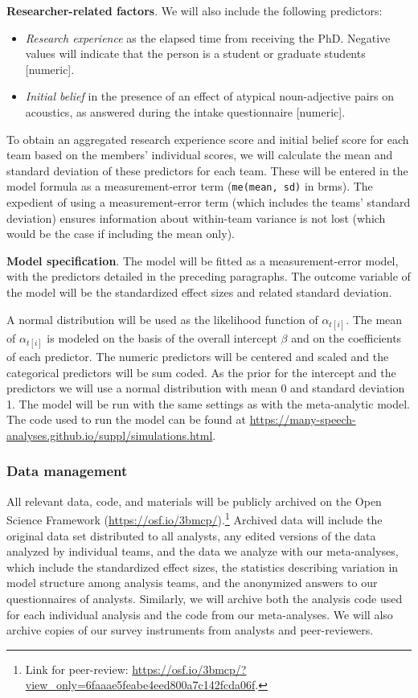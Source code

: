 \documentclass[Review,times,sageh]{sagej}
\providecommand{\tightlist}{\setlength{\itemsep}{0pt}\setlength{\parskip}{0pt}}
\begin{document}
\textbf{Researcher-related factors}. We will also include the following
predictors:

\begin{itemize}
\tightlist
\item
  \emph{Research experience} as the elapsed time from receiving the PhD.
  Negative values will indicate that the person is a student or graduate
  students {[}numeric{]}.
\item
  \emph{Initial belief} in the presence of an effect of atypical
  noun-adjective pairs on acoustics, as answered during the intake
  questionnaire {[}numeric{]}.
\end{itemize}

To obtain an aggregated research experience score and initial belief
score for each team based on the members' individual scores, we will
calculate the mean and standard deviation of these predictors for each
team. These will be entered in the model formula as a measurement-error
term (\texttt{me(mean,\ sd)} in brms). The expedient of using a
measurement-error term (which includes the teams' standard deviation)
ensures information about within-team variance is not lost (which would
be the case if including the mean only).

\textbf{Model specification}. The model will be fitted as a
measurement-error model, with the predictors detailed in the preceding
paragraphs. The outcome variable of the model will be the standardized
effect sizes and related standard deviation.

A normal distribution will be used as the likelihood function of
\(\alpha_{t[i]}\). The mean of \(\alpha_{t[i]}\) is modeled on the basis
of the overall intercept \(\beta\) and on the coefficients of each
predictor. The numeric predictors will be centered and scaled and the
categorical predictors will be sum coded. As the prior for the intercept
and the predictors we will use a normal distribution with mean 0 and
standard deviation 1. The model will be run with the same settings as
with the meta-analytic model. The code used to run the model can be
found at
\url{https://many-speech-analyses.github.io/suppl/simulations.html}.

\subsubsection{Data management}\label{ana-archive}

All relevant data, code, and materials will be publicly archived on the
Open Science Framework (\url{https://osf.io/3bmcp/}).\footnote{Link for
  peer-review:
  \url{https://osf.io/3bmcp/?view_only=6faaae5feabe4eed800a7c142fcda06f}.}
Archived data will include the original data set distributed to all
analysts, any edited versions of the data analyzed by individual teams,
and the data we analyze with our meta-analyses, which include the
standardized effect sizes, the statistics describing variation in model
structure among analysis teams, and the anonymized answers to our
questionnaires of analysts. Similarly, we will archive both the analysis
code used for each individual analysis and the code from our
meta-analyses. We will also archive copies of our survey instruments
from analysts and peer-reviewers.
\end{document}
